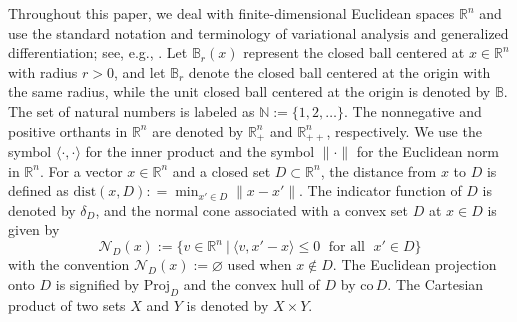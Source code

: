 \documentclass[11pt,a4paper]{article}
\theoremstyle{plain}
\begin{document}
Throughout this paper, we deal with finite-dimensional Euclidean spaces $\mathbb R^n$ and use the standard notation and terminology of variational analysis and generalized differentiation;  see, e.g., \cite{mordukhovich2018variational,rockafellar1998variational}. 
Let $\mathbb{B}_r(x)$ represent the closed ball centered at $x \in \mathbb{R}^n$
with radius $r > 0$, and let $\mathbb{B}_r$ denote the closed ball centered at the origin with the same radius, while the unit closed ball centered at the origin is denoted by $\mathbb{B}$.
The set of natural numbers is labeled as  $\mathbb{N} := \{1, 2, \dots\}$. 
The nonnegative and positive orthants in $\mathbb{R}^n$ are denoted by $\mathbb{R}^n_+$ and $\mathbb{R}^n_{++}$, respectively. We use the symbol $\langle \cdot, \cdot \rangle$ for the inner product and the symbol $\|\cdot\|$ for the Euclidean norm in $\mathbb{R}^n$. For a vector \( x \in \mathbb{R}^n \) and a closed set \( D \subset \mathbb{R}^n \), the distance from \( x \) to \( D \) is defined as \(\mathrm{dist}(x, D): = \min_{x' \in D} \|x - x'\|\). The indicator function of \( D \) is denoted by \(\delta_D\), and the normal cone associated with a convex set \( D \) at \( x\in D \) is given by 
\begin{equation}\label{nc-conv}
\mathcal{N}_D(x) := \big\{ v \in \mathbb{R}^n ~\big|~ \langle v, x' - x\rangle \le 0\;\mbox{  for all }\;x' \in D\big\}
\end{equation}
with the convention $\mathcal{N}_D(x) :=\varnothing$ used when $x \notin D$. The Euclidean projection onto \( D \) is signified by \(\mathrm{Proj}_D\) and the convex hull of $D$ by $\mathrm{co}\, D$. The Cartesian product of two sets \( X \) and \( Y \) is denoted by \( X \times Y \).
\end{document}
